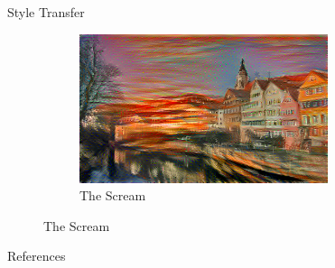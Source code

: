 \documentclass{beamer}
\begin{document}
\begin{frame}{Style Transfer}
\begin{figure}
{\begin{figure}[ht]
    \end{figure}
}{
    \begin{figure}[ht]
    \centering
    \caption*{The Scream}
    \includegraphics[width=0.8\textwidth,height=0.27\textheight]{img/transfer/scream}
    \end{figure}
}
\end{figure}
\end{frame}

\begin{frame}[allowframebreaks]{References}
    
    
\end{frame}
\end{document}
